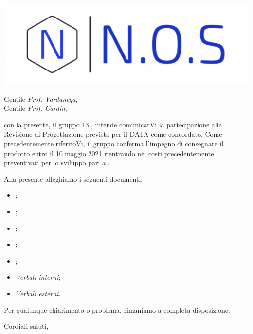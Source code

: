 \documentclass[12pt]{letter}
\date{08 marzo 2021}
\begin{document}
\begin{letter}{ }

\includegraphics[scale=1.5
]{../../../Immagini/N.O.S.jpg}

\opening{Gentile \textit{Prof. Vardanega},\\ Gentile \textit{Prof. Cardin}, }

con la presente, il gruppo 13 {\Gruppo}, intende comunicarVi la partecipazione alla Revisione di Progettazione prevista per il DATA come concordato.
Come precedentemente riferitoVi, il gruppo conferma l'impegno di consegnare il prodotto entro il 10 maggio 2021 rientrando nei costi precedentemente preventivati per lo sviluppo pari a .

Alla presente alleghiamo i seguenti documenti:

\begin{itemize}
	\item {};
	\item {};
	\item {};
	\item {};
	\item {};
	\item \textit{Verbali interni};
	\item \textit{Verbali esterni}.
\end{itemize}

Per qualunque chiarimento o problema, rimaniamo a completa disposizione.

\closing{Cordiali saluti, }

\vspace{2em}

\end{letter}
\end{document}
